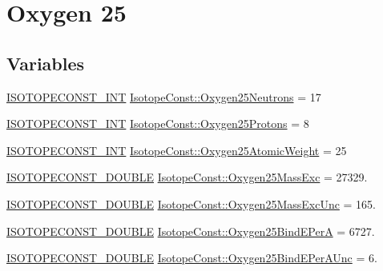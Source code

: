 \hypertarget{group___isotope_const-_oxygen-_o25}{}\section{Oxygen 25}
\label{group___isotope_const-_oxygen-_o25}
\subsection*{Variables}
\begin{DoxyCompactItemize}
\item 
\mbox{\hyperlink{group___isotope_const-_macros_ga5f18360b3e99483a35c32d789e62621c}{I\+S\+O\+T\+O\+P\+E\+C\+O\+N\+S\+T\+\_\+\+I\+NT}} \mbox{\hyperlink{group___isotope_const-_oxygen-_o25_ga6afe70c03bf1c66503e75468524c9e94}{Isotope\+Const\+::\+Oxygen25\+Neutrons}} = 17
\item 
\mbox{\hyperlink{group___isotope_const-_macros_ga5f18360b3e99483a35c32d789e62621c}{I\+S\+O\+T\+O\+P\+E\+C\+O\+N\+S\+T\+\_\+\+I\+NT}} \mbox{\hyperlink{group___isotope_const-_oxygen-_o25_ga69aa9793d08b9d203e0e22e1f2185c14}{Isotope\+Const\+::\+Oxygen25\+Protons}} = 8
\item 
\mbox{\hyperlink{group___isotope_const-_macros_ga5f18360b3e99483a35c32d789e62621c}{I\+S\+O\+T\+O\+P\+E\+C\+O\+N\+S\+T\+\_\+\+I\+NT}} \mbox{\hyperlink{group___isotope_const-_oxygen-_o25_ga91117d7c9ebd65cfa9b37e60d6d3068d}{Isotope\+Const\+::\+Oxygen25\+Atomic\+Weight}} = 25
\item 
\mbox{\hyperlink{group___isotope_const-_macros_ga8f45a7272ce02c0b4c65c44636ed719a}{I\+S\+O\+T\+O\+P\+E\+C\+O\+N\+S\+T\+\_\+\+D\+O\+U\+B\+LE}} \mbox{\hyperlink{group___isotope_const-_oxygen-_o25_gaceee34e4fe53c1ce29390e5eec3a2816}{Isotope\+Const\+::\+Oxygen25\+Mass\+Exc}} = 27329.
\item 
\mbox{\hyperlink{group___isotope_const-_macros_ga8f45a7272ce02c0b4c65c44636ed719a}{I\+S\+O\+T\+O\+P\+E\+C\+O\+N\+S\+T\+\_\+\+D\+O\+U\+B\+LE}} \mbox{\hyperlink{group___isotope_const-_oxygen-_o25_ga4ab53295ccc8720531826eea5b4a6ea6}{Isotope\+Const\+::\+Oxygen25\+Mass\+Exc\+Unc}} = 165.
\item 
\mbox{\hyperlink{group___isotope_const-_macros_ga8f45a7272ce02c0b4c65c44636ed719a}{I\+S\+O\+T\+O\+P\+E\+C\+O\+N\+S\+T\+\_\+\+D\+O\+U\+B\+LE}} \mbox{\hyperlink{group___isotope_const-_oxygen-_o25_gaaf6bb978909e7a4d2e93f166ea33a21d}{Isotope\+Const\+::\+Oxygen25\+Bind\+E\+PerA}} = 6727.
\item 
\mbox{\hyperlink{group___isotope_const-_macros_ga8f45a7272ce02c0b4c65c44636ed719a}{I\+S\+O\+T\+O\+P\+E\+C\+O\+N\+S\+T\+\_\+\+D\+O\+U\+B\+LE}} \mbox{\hyperlink{group___isotope_const-_oxygen-_o25_gaeb61e14678ff2c21990f64a5794236f0}{Isotope\+Const\+::\+Oxygen25\+Bind\+E\+Per\+A\+Unc}} = 6.

\end{DoxyCompactItemize}
